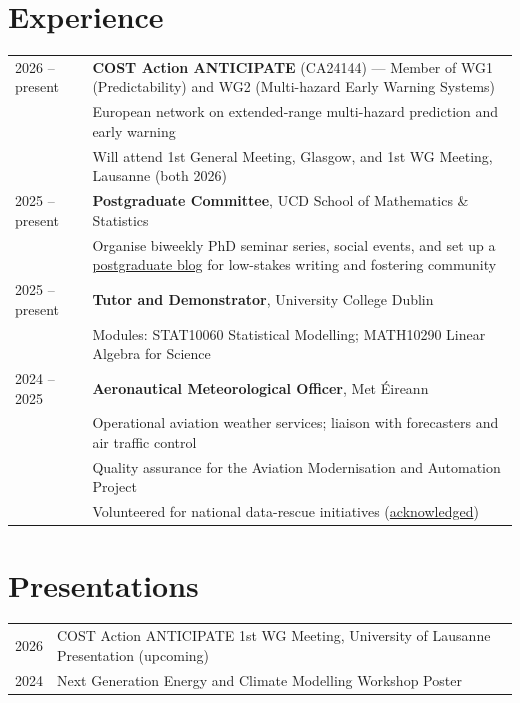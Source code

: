 \documentclass[a4paper,11pt]{article}
\begin{document}
{\section{Experience}

\begin{tabularx}{\linewidth}{@{}l X@{}}
2026 -- present & \textbf{COST Action ANTICIPATE} (CA24144) — Member of WG1 (Predictability) and WG2 (Multi-hazard Early Warning Systems) \\
                & European network on extended-range multi-hazard prediction and early warning \\
                & Will attend 1st General Meeting, Glasgow, and 1st WG Meeting, Lausanne (both 2026) \\[8pt]
2025 -- present & \textbf{Postgraduate Committee}, UCD School of Mathematics \& Statistics \\
                & Organise biweekly PhD seminar series, social events, and set up a \href{https://the-ensemble-site.vercel.app}{postgraduate blog} for low-stakes writing and fostering community \\[20pt]
2025 -- present & \textbf{Tutor and Demonstrator}, University College Dublin \\
                & Modules: STAT10060 Statistical Modelling; MATH10290 Linear Algebra for Science \\[8pt]
2024 -- 2025    & \textbf{Aeronautical Meteorological Officer}, Met Éireann \\
                & Operational aviation weather services; liaison with forecasters and air traffic control \\
                & Quality assurance for the Aviation Modernisation and Automation Project \\
                & Volunteered for national data-rescue initiatives (\href{https://doi.org/10.1002/joc.70185}{acknowledged}) \\
\end{tabularx}

\section{Presentations}

\begin{tabularx}{\linewidth}{@{}l X@{}}
2026 & COST Action ANTICIPATE \textbar{} 1st WG Meeting, University of Lausanne \textbar{} Presentation (upcoming) \\
2024 & Next Generation Energy and Climate Modelling Workshop \textbar{} Poster \\
\end{tabularx}

}
\end{document}
